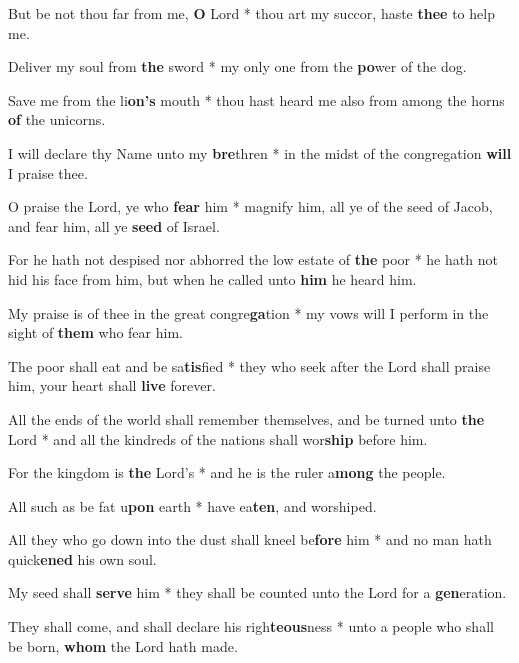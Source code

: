 \begin{multicols}{2}
	But be not thou far from me, \textbf{O} Lord * thou art my succor, haste \textbf{thee} to help me.
	
	Deliver my soul from \textbf{the} sword * my only one from the \textbf{po}wer of the dog.
	
	Save me from the li\textbf{on's} mouth * thou hast heard me also from among the horns \textbf{of} the unicorns.
	
	I will declare thy Name unto my \textbf{bre}thren * in the midst of the congregation \textbf{will} I praise thee.
	
	O praise the Lord, ye who \textbf{fear} him * magnify him, all ye of the seed of Jacob, and fear him, all ye \textbf{seed} of Israel.
	
	For he hath not despised nor abhorred the low estate of \textbf{the} poor * he hath not hid his face from him, but when he called unto \textbf{him} he heard him.
	
	My praise is of thee in the great congre\textbf{ga}tion * my vows will I perform in the sight of \textbf{them} who fear him.
	
	The poor shall eat and be sa\textbf{tis}fied * they who seek after the Lord shall praise him, your heart shall \textbf{live} forever.
	
	All the ends of the world shall remember themselves, and be turned unto \textbf{the} Lord * and all the kindreds of the nations shall wor\textbf{ship} before him.
	
	For the kingdom is \textbf{the} Lord's * and he is the ruler a\textbf{mong} the people.
	
	All such as be fat u\textbf{pon} earth * have ea\textbf{ten}, and worshiped.
	
	All they who go down into the dust shall kneel be\textbf{fore} him * and no man hath quick\textbf{ened} his own soul.
	
	My seed shall \textbf{serve} him * they shall be counted unto the Lord for a \textbf{gen}eration.
	
	They shall come, and shall declare his righ\textbf{teous}ness * unto a people who shall be born, \textbf{whom} the Lord hath made.
\end{multicols}